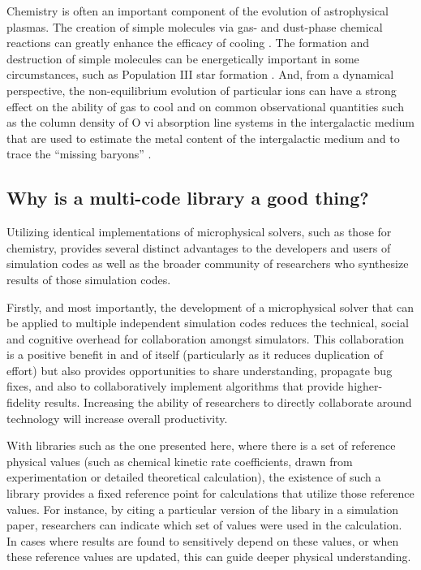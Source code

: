 Chemistry is often an important component of the evolution of
astrophysical plasmas.  The creation of simple molecules via gas- and
dust-phase chemical reactions can greatly enhance the efficacy of
cooling \citep{1979ApJS...41..555H, 2005ApJ...626..627O}.  The formation
and destruction of simple molecules can be energetically important in
some circumstances, such as Population III star formation
\citep{1998ApJ...508..141O, 2002Sci...295...93A, 2008MNRAS.388.1627G,
2009Sci...325..601T}.
And, from a dynamical perspective, the non-equilibrium evolution of
particular ions can have a strong effect on the ability of gas to cool
\citep{1997NewA....2..181A, 1997NewA....2..209A} and on common
observational quantities such as the column density of O {\sc vi} absorption
line systems in the intergalactic medium that are used to estimate the
metal content of the intergalactic medium and to trace the ``missing
baryons'' \citep{2006ApJ...650..573C, 2011ApJ...731....6S,
  2013MNRAS.430.1548H, 2013MNRAS.434.1043O, 2014ApJ...796...49S}.

\subsection{Why is a multi-code library a good thing?}

Utilizing identical implementations of microphysical solvers, such as
those for chemistry, provides several distinct advantages to the
developers and users of simulation codes as well as the broader
community of researchers who synthesize results of those simulation
codes.

Firstly, and most importantly, the development of a microphysical solver that
can be applied to multiple independent simulation codes reduces the technical,
social and cognitive overhead for collaboration amongst simulators.
This collaboration is a positive benefit in and of itself (particularly as it
reduces duplication of effort) but also provides opportunities to share
understanding, propagate bug fixes, and also to collaboratively implement 
algorithms that provide higher-fidelity results.  Increasing the ability of
researchers to directly collaborate around technology will increase overall
productivity.

With libraries such as the one presented here, where there is a set of
reference
physical values (such as chemical kinetic rate coefficients, drawn from
experimentation or detailed theoretical calculation), the existence of such a
library provides a fixed reference point for calculations that utilize those
reference values.  For instance, by citing a particular version of
the libary in a simulation paper, researchers can indicate which set of
values were used in the calculation.  In cases where results are found to
sensitively depend on these values, or when these reference values are updated,
this can guide deeper physical understanding.

